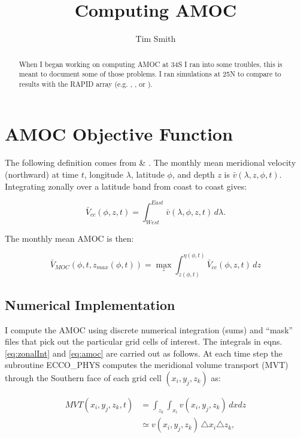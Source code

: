 \documentclass[a4paper,11pt]{article}
\title{\vspace{-10ex}Computing AMOC}
\author{Tim Smith}
\date{\vspace{-3ex}}
\begin{document}
\maketitle

\begin{abstract}
  When I began working on computing AMOC at 34S I ran into some troubles, this is meant to document some of those problems. I ran simulations at 25N to compare to results with the RAPID array (e.g. \cite{wunschLinear}, \cite{wunschAndHeimbach_AMOC}, or \cite{mcCarthy}). 
\end{abstract}


\section{AMOC Objective Function}

  The following definition comes from \cite{wunschLinear} \& \cite{wunschAndHeimbach_AMOC}. The monthly mean meridional velocity (northward) at time $t$, longitude $\lambda$, latitude $\phi$, and depth $z$ is $\bar{v}(\lambda,z,\phi,t)$. Integrating zonally over a latitude band from coast to coast gives: 
  
  \begin{equation}
   \bar{V}_{cc}(\phi,z,t) = \int_{West}^{East}\bar{v}(\lambda,\phi,z,t)\,d\lambda .
   \label{eq:zonalInt}
  \end{equation}

  The monthly mean AMOC is then: 
  
  \begin{equation}
    \bar{V}_{MOC}(\phi,t,z_{max}(\phi,t)) = \max_z\int_{z(\phi,t)}^{\eta(\phi,t)}\bar{V}_{cc}(\phi,z,t) \, dz
    \label{eq:amoc}
  \end{equation}
  
  \subsection{Numerical Implementation}
  
  I compute the AMOC using discrete numerical integration (sums) and ``mask'' files that pick out the particular grid cells of interest. The integrals in eqns. \ref{eq:zonalInt} and \ref{eq:amoc} are carried out as follows. At each time step the subroutine ECCO\_PHYS computes the meridional volume transport (MVT) through the Southern face of each grid cell $(x_i,y_j,z_k)$ as: 
  
  \begin{align}
    MVT(x_i,y_j,z_k,t) &= \int_{z_k}\int_{x_i}v(x_i,y_j,z_k) \,dx dz \\
				    &\simeq v(x_i,y_j,z_k) \,  \triangle x_i \triangle z_k ,
    \label{eq:MVT}
  \end{align}
  
\end{document}
